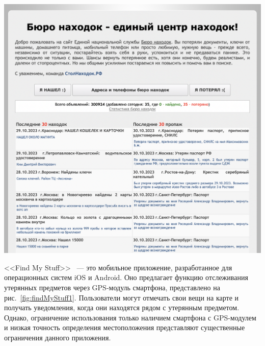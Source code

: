 \documentclass{mirea-article}
\newenvironment{Figure}
{\par\medskip\noindent\minipage{\linewidth}}
{\endminipage\par\medskip}
\begin{document}
\begin{multicols}{2}
		\begin{Figure}
			\centering
			\includegraphics[width=\textwidth]{../images/stolNahodok1}
			\label{fig:stolNahodok1}
		\end{Figure}
		
		<<Find My Stuff>>~\cite{bib:find_my_stuff} --- это мобильное приложение, разработанное для операционных систем iOS и Android. Оно предлагает функцию отслеживания утерянных предметов через GPS-модуль смартфона, представлено на рис.~\ref{fig:findMyStuff1}. Пользователи могут отмечать свои вещи на карте и получать уведомления, когда они находятся рядом с утерянным предметом. Однако, ограничение использования только наличием смартфона с GPS-модулем и низкая точность определения местоположения представляют существенные ограничения данного приложения.
		

\end{multicols}
\end{document}
